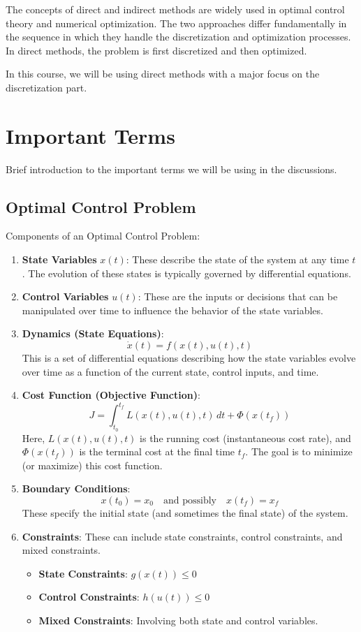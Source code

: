 \documentclass[12pt]{report} %
\begin{document}
The concepts of direct and indirect methods are widely used in optimal control theory and numerical optimization. The two approaches differ fundamentally in the sequence in which they handle the discretization and optimization processes. In direct methods, the problem is first discretized and then optimized.

In this course, we will be using direct methods with a major focus on the discretization part.

\section{Important Terms}
Brief introduction to the important terms we will be using in the discussions.

\subsection{Optimal Control Problem}
Components of an Optimal Control Problem:
\begin{enumerate}
    \item \textbf{State Variables} \(x(t)\): These describe the state of the system at any time \(t\). The evolution of these states is typically governed by differential equations.
    \item \textbf{Control Variables} \(u(t)\): These are the inputs or decisions that can be manipulated over time to influence the behavior of the state variables.
    \item \textbf{Dynamics (State Equations)}:
    \[
    \dot{x}(t) = f(x(t), u(t), t)
    \]
    This is a set of differential equations describing how the state variables evolve over time as a function of the current state, control inputs, and time.
    \item \textbf{Cost Function (Objective Function)}:
    \[
    J = \int_{t_0}^{t_f} L(x(t), u(t), t)\, dt + \Phi(x(t_f))
    \]
    Here, \(L(x(t), u(t), t)\) is the running cost (instantaneous cost rate), and \(\Phi(x(t_f))\) is the terminal cost at the final time \(t_f\). The goal is to minimize (or maximize) this cost function.
    \item \textbf{Boundary Conditions}:
    \[
    x(t_0) = x_0 \quad \text{and possibly} \quad x(t_f) = x_f
    \]
    These specify the initial state (and sometimes the final state) of the system.
    \item \textbf{Constraints}: These can include state constraints, control constraints, and mixed constraints.
    \begin{itemize}
        \item \textbf{State Constraints}: \(g(x(t)) \leq 0\)
        \item \textbf{Control Constraints}: \(h(u(t)) \leq 0\)
        \item \textbf{Mixed Constraints}: Involving both state and control variables.
    \end{itemize}
\end{enumerate}
\end{document}
